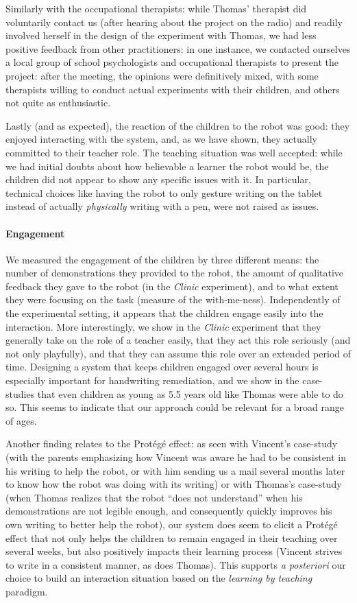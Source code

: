 \documentclass{article}
\begin{document}
Similarly with the occupational therapists: while Thomas' therapist did
voluntarily contact us (after hearing about the project on the radio) and
readily involved herself in the design of the experiment with Thomas, we had
less positive feedback from other practitioners: in one instance, we contacted
ourselves a local group of school psychologists and occupational therapists to
present the project: after the meeting, the opinions were definitively mixed,
with some therapists willing to conduct actual experiments with their children,
and others not quite as enthusiastic.

Lastly (and as expected), the reaction of the children to the robot was good:
they enjoyed interacting with the system, and, as we have shown, they actually
committed to their teacher role. The teaching situation was well accepted: while
we had initial doubts about how believable a learner the robot would be, the
children did not appear to show any specific issues with it. In particular,
technical choices like having the robot to only gesture writing on the tablet
instead of actually \emph{physically} writing with a pen, were not raised as
issues.

\paragraph{Engagement} We measured the engagement of the children by three
different means: the number of demonstrations they provided to the robot, the
amount of qualitative feedback they gave to the robot (in the \emph{Clinic}
experiment), and to what extent they were focusing on the task (measure of the
with-me-ness). Independently of the experimental setting, it appears that the
children engage easily into the interaction. More interestingly, we show in the
\emph{Clinic} experiment that they generally take on the role of a teacher
easily, that they act this role seriously (and not only playfully), and that
they can assume this role over an extended period of time. Designing a system
that keeps children engaged over several hours is especially important for
handwriting remediation, and we show in the case-studies that even children as
young as 5.5 years old like Thomas were able to do so. This seems to indicate
that our approach could be relevant for a broad range of ages.

Another finding relates to the Protégé effect: as seen with Vincent's case-study
(with the parents emphasizing how Vincent was aware he had to be consistent in
his writing to help the robot, or with him sending us a mail several months
later to know how the robot was doing with its writing) or with Thomas's
case-study (when Thomas realizes that the robot ``does not understand'' when his
demonstrations are not legible enough, and consequently quickly improves his
own writing to better help the robot), our system does seem to elicit a Protégé
effect that not only helps the children to remain engaged in their teaching
over several weeks, but also positively impacts their learning process (Vincent
strives to write in a consistent manner, as does Thomas). This supports {\it a
posteriori} our choice to build an interaction situation based on the
\emph{learning by teaching} paradigm.
\end{document}
